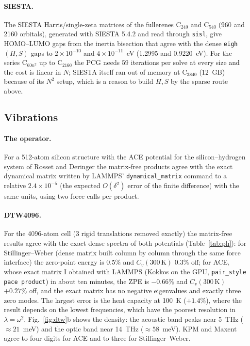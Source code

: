 \documentclass[reprint,nofootinbib,superscriptaddress,amsmath,amssymb,aps,prb,floatfix]{revtex4-2}
\begin{document}
\paragraph*{SIESTA.}
The SIESTA Harris/single-zeta matrices of the fullerenes C$_{240}$ and C$_{540}$ (960 and 2160 orbitals), generated with SIESTA 5.4.2 \cite{siesta2020} and read through \texttt{sisl}, give HOMO--LUMO gaps from the inertia bisection that agree with the dense \texttt{eigh}$(H,S)$ gaps to $2\times10^{-10}$ and $4\times10^{-11}$~eV (1.2995 and 0.9220~eV).
For the series C$_{60n^2}$ up to C$_{2160}$ the PCG needs $59$ iterations per solve at every size and the cost is linear in $N$; SIESTA itself ran out of memory at C$_{3840}$ (12~GB) because of its $N^2$ setup, which is a reason to build $H,S$ by the sparse route above.



\subsection{Vibrations}
\label{sec:val_vib}

\paragraph*{The operator.}
For a 512-atom silicon structure with the ACE potential \cite{ace,pace} for the silicon--hydrogen system of Rosset and Deringer \cite{rosset2026} the matrix-free products agree with the exact dynamical matrix written by LAMMPS' \texttt{dynamical\_matrix} command to a relative $2.4\times10^{-5}$ (the expected $O(\delta^2)$ error of the finite difference) with the same units, using two force calls per product.
\paragraph*{DTW4096.}
For the 4096-atom cell (3 rigid translations removed exactly) the matrix-free results agree with the exact dense spectra of both potentials (Table~\ref{tab:ph}): for Stillinger--Weber \cite{sw} (dense matrix built column by column through the same force interface) the zero-point energy is $0.5\%$ and $C_v(300\,\mathrm{K})$ $0.3\%$ off; for ACE, whose exact matrix I obtained with LAMMPS (Kokkos on the GPU, \texttt{pair\_style pace product}) in about ten minutes, the ZPE is $-0.66\%$ and $C_v(300\,\mathrm{K})$ $+0.27\%$ off, and the exact matrix has no negative eigenvalues and exactly three zero modes.
The largest error is the heat capacity at 100~K ($+1.4\%$), where the result depends on the lowest frequencies, which have the poorest resolution in $\lambda=\omega^2$.
Fig.~\ref{fig:dtw}b shows the density: the acoustic band peaks near 5~THz ($\approx21$~meV) and the optic band near 14~THz ($\approx58$~meV).
KPM and Maxent agree to four digits for ACE and to three for Stillinger--Weber.
\end{document}
